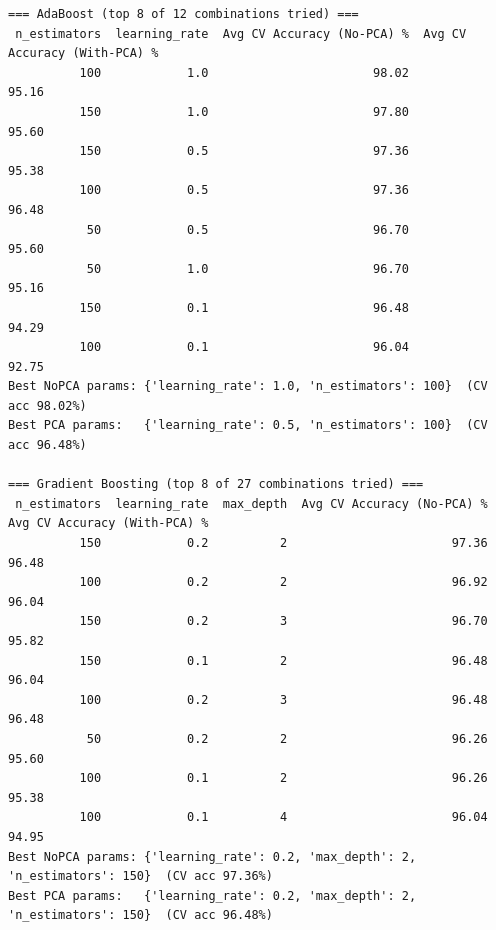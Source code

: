 \documentclass[12pt,a4paper]{article}
\begin{document}
\begin{verbatim}
=== AdaBoost (top 8 of 12 combinations tried) ===
 n_estimators  learning_rate  Avg CV Accuracy (No-PCA) %  Avg CV Accuracy (With-PCA) %
          100            1.0                       98.02                         95.16
          150            1.0                       97.80                         95.60
          150            0.5                       97.36                         95.38
          100            0.5                       97.36                         96.48
           50            0.5                       96.70                         95.60
           50            1.0                       96.70                         95.16
          150            0.1                       96.48                         94.29
          100            0.1                       96.04                         92.75
Best NoPCA params: {'learning_rate': 1.0, 'n_estimators': 100}  (CV acc 98.02%)
Best PCA params:   {'learning_rate': 0.5, 'n_estimators': 100}  (CV acc 96.48%)

=== Gradient Boosting (top 8 of 27 combinations tried) ===
 n_estimators  learning_rate  max_depth  Avg CV Accuracy (No-PCA) %  Avg CV Accuracy (With-PCA) %
          150            0.2          2                       97.36                         96.48
          100            0.2          2                       96.92                         96.04
          150            0.2          3                       96.70                         95.82
          150            0.1          2                       96.48                         96.04
          100            0.2          3                       96.48                         96.48
           50            0.2          2                       96.26                         95.60
          100            0.1          2                       96.26                         95.38
          100            0.1          4                       96.04                         94.95
Best NoPCA params: {'learning_rate': 0.2, 'max_depth': 2, 'n_estimators': 150}  (CV acc 97.36%)
Best PCA params:   {'learning_rate': 0.2, 'max_depth': 2, 'n_estimators': 150}  (CV acc 96.48%)


\end{verbatim}
\end{document}
